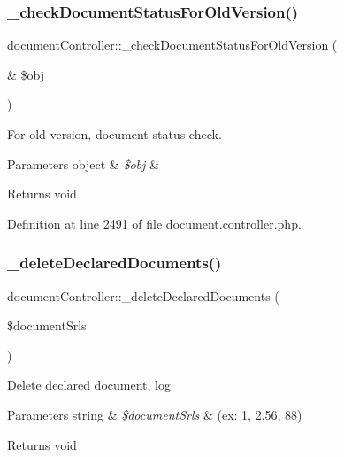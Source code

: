 \hypertarget{classdocumentController_ad0d7bdcafe22b9f7ee8f5ae072f3f146}{}\label{classdocumentController_ad0d7bdcafe22b9f7ee8f5ae072f3f146} 
\subsubsection{\texorpdfstring{\+\_\+check\+Document\+Status\+For\+Old\+Version()}{\_checkDocumentStatusForOldVersion()}}
{\footnotesize\ttfamily document\+Controller\+::\+\_\+check\+Document\+Status\+For\+Old\+Version (\begin{DoxyParamCaption}\item[{\&}]{\$obj }\end{DoxyParamCaption})}

For old version, document status check. 
\begin{DoxyParams}[1]{Parameters}
object & {\em \$obj} & \\
\hline
\end{DoxyParams}
\begin{DoxyReturn}{Returns}
void 
\end{DoxyReturn}


Definition at line 2491 of file document.\+controller.\+php.

\hypertarget{classdocumentController_a2514acfe313b7ddd5daccb50557d38b5}{}\label{classdocumentController_a2514acfe313b7ddd5daccb50557d38b5} 
\subsubsection{\texorpdfstring{\+\_\+delete\+Declared\+Documents()}{\_deleteDeclaredDocuments()}}
{\footnotesize\ttfamily document\+Controller\+::\+\_\+delete\+Declared\+Documents (\begin{DoxyParamCaption}\item[{}]{\$document\+Srls }\end{DoxyParamCaption})}

Delete declared document, log 
\begin{DoxyParams}[1]{Parameters}
string & {\em \$document\+Srls} & (ex\+: 1, 2,56, 88) \\
\hline
\end{DoxyParams}
\begin{DoxyReturn}{Returns}
void 
\end{DoxyReturn}


